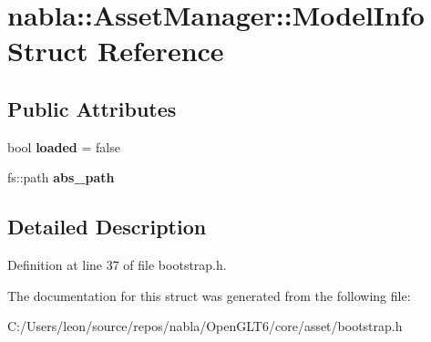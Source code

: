 \hypertarget{structnabla_1_1_asset_manager_1_1_model_info}{}\section{nabla\+::Asset\+Manager\+::Model\+Info Struct Reference}
\label{structnabla_1_1_asset_manager_1_1_model_info}
\subsection*{Public Attributes}
\begin{DoxyCompactItemize}
\item 
\mbox{\label{structnabla_1_1_asset_manager_1_1_model_info_a7d49ed6cff5803f6376edd4754049ea4}} 
bool {\bfseries loaded} = false
\item 
\mbox{\label{structnabla_1_1_asset_manager_1_1_model_info_afb79fe53a63f95938b6131d2ee7a6a7f}} 
fs\+::path {\bfseries abs\+\_\+path}
\end{DoxyCompactItemize}


\subsection{Detailed Description}


Definition at line 37 of file bootstrap.\+h.



The documentation for this struct was generated from the following file\+:\begin{DoxyCompactItemize}
\item 
C\+:/\+Users/leon/source/repos/nabla/\+Open\+G\+L\+T6/core/asset/bootstrap.\+h\end{DoxyCompactItemize}
